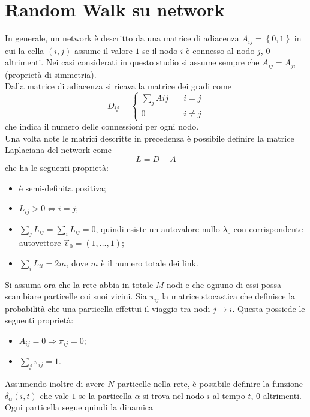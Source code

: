 \documentclass[../main.tex]{subfiles}
\begin{document}
\section{Random Walk su network}
In generale, un network è descritto da una matrice di adiacenza $A_{ij}=\left\{0,1\right\}$ in cui la cella $(i,j)$ assume il valore $1$ se il nodo $i$ è connesso al nodo $j$, $0$ altrimenti.
Nei casi considerati in questo studio si assume sempre che $A_{ij}=A_{ji}$ (proprietà di simmetria).
\\Dalla matrice di adiacenza si ricava la matrice dei gradi come
\begin{equation*}
    D_{ij}=
    \begin{cases}
        \sum_jA{ij} \quad &i=j\\
        0 &i\neq j
    \end{cases}
\end{equation*}
che indica il numero delle connessioni per ogni nodo.
\\Una volta note le matrici descritte in precedenza è possibile definire la matrice Laplaciana del network come
\begin{equation}
    L=D-A
\end{equation}
che ha le seguenti proprietà:
\begin{itemize}
    \item è semi-definita positiva;
    \item $L_{ij}>0\Longleftrightarrow i=j$;
    \item $\sum_jL_{ij}=\sum_iL_{ij}=0$, quindi esiste un autovalore nullo $\lambda_0$ con corrispondente autovettore $\vec{v}_0=(1,\ldots,1)$;
    \item $\sum_iL_{ii}=2m$, dove $m$ è il numero totale dei link.
\end{itemize}
Si assuma ora che la rete abbia in totale $M$ nodi e che ognuno di essi possa scambiare particelle coi suoi vicini.
Sia $\pi_{ij}$ la matrice stocastica che definisce la probabilità che una particella effettui il viaggio tra nodi $j\to i$.
Questa possiede le seguenti proprietà:
\begin{itemize}
    \item $A_{ij}=0 \Longrightarrow \pi_{ij}=0$;
    \item $\sum_j\pi_{ij}=1$.
\end{itemize}
Assumendo inoltre di avere $N$ particelle nella rete, è possibile definire la funzione $\delta_\alpha(i,t)$ che vale $1$ se la particella $\alpha$ si trova nel nodo $i$ al tempo $t$, 0 altrimenti.
\\Ogni particella segue quindi la dinamica
\end{document}
